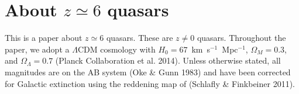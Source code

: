 \section{\texorpdfstring{About \(z\simeq{}6\)
quasars}{About z\textbackslash{}simeq\{\}6 quasars}}\label{about-z6-quasars}

This is a paper about \(z\simeq{}6\) quasars. These are \(z\neq{}0\)
quasars. Throughout the paper, we adopt a \(\Lambda{}\)CDM cosmology
with \(H_{0}=67\)~km~s\(^{-1}\)~Mpc\(^{-1}\), \(\Omega{}_M=0.3\), and
\(\Omega{}_\Lambda{}=0.7\) (Planck Collaboration et al. 2014). Unless
otherwise stated, all magnitudes are on the AB system (Oke \& Gunn 1983)
and have been corrected for Galactic extinction using the reddening map
of (Schlafly \& Finkbeiner 2011).
